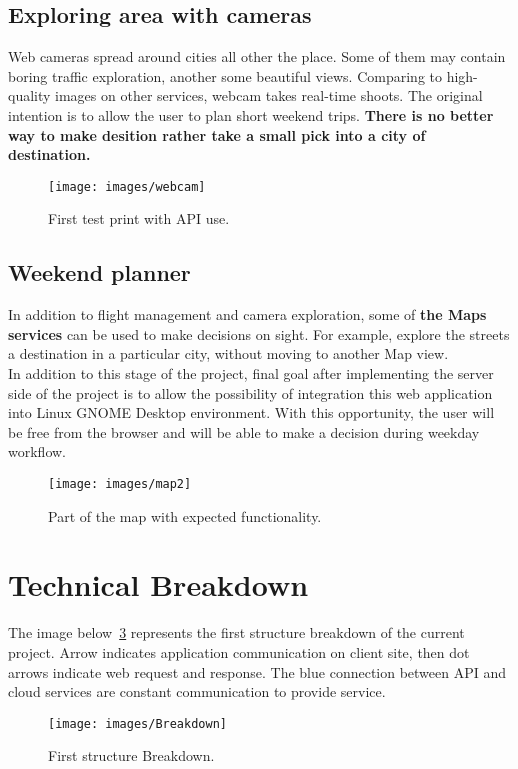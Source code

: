 \documentclass[12pt]{article}
\numberwithin{equation}{section} %
\numberwithin{figure}{section} %
\numberwithin{table}{section} %
\begin{document}
	\subsection{Exploring area with cameras}
	Web cameras spread around cities all other the place. Some of them may contain boring traffic exploration, another some beautiful views. Comparing to high-quality images on other services, webcam takes real-time shoots. The original intention is to allow the user to plan short weekend trips. \textbf{There is no better way to make desition rather take a small pick into a city of destination.}
	\begin{figure}[H]
		\centering        
		\texttt{[image: images/webcam]}
		\caption{First test print with API use.}
		\label{fig:webcam}
	\end{figure}
	\subsection{Weekend planner}
	In addition to flight management and camera exploration, some of \textbf{the Maps services} can be used to make decisions on sight. For example, explore the streets a destination in a particular city, without moving to another Map view. \\
	In addition to this stage of the project, final goal after implementing the server side of the project is to allow the possibility of integration this web application into Linux GNOME Desktop environment. With this opportunity, the user will be free from the browser and will be able to make a decision during weekday workflow.
	
	\begin{figure}[H]
		\centering        
		\texttt{[image: images/map2]}
		\caption{Part of the map with expected functionality.}
		\label{fig:map2}
	\end{figure}
		
\newpage
\section{Technical Breakdown}	
	The image below~\ref{fig:break} represents the first structure breakdown of the current project. Arrow indicates application communication on client site, then dot arrows indicate web request and response. The blue connection between API and cloud services are constant communication to provide service.
	\begin{figure}[H]
		\centering		
		\texttt{[image: images/Breakdown]}
		\caption{First structure Breakdown.}
		\label{fig:break}
	\end{figure}	
\newpage
\end{document}
